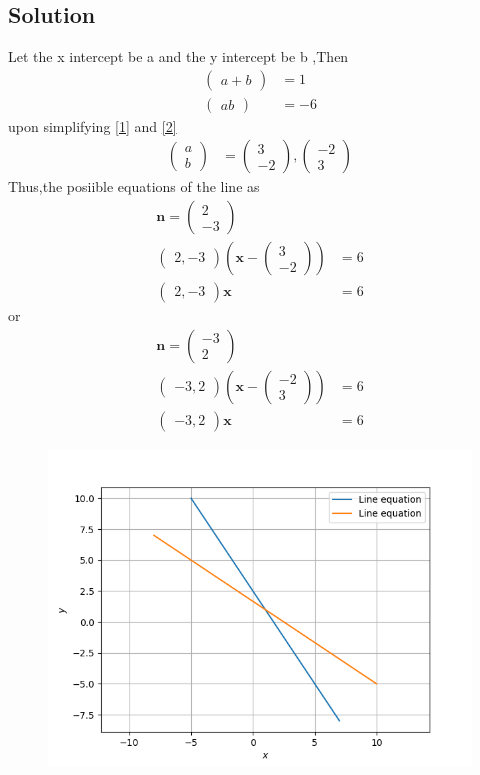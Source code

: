 \documentclass[12pt]{article}
\newcommand{\myvec}[1]{\ensuremath{\begin{pmatrix}#1\end{pmatrix}}}
\let\vec\mathbf
\begin{document}
\begin{enumerate}
\section{Solution}
Let the x intercept be a and  the y intercept be b ,Then
\begin{align}
\myvec{a+b}&=1\label{1}\\
\myvec{ab}&=-6 \label{2}
\end{align}
upon simplifying \eqref{1} and \eqref{2}
\begin{align}
\myvec{a\\b}&=\myvec{3\\-2},\myvec{-2\\3}
\end{align}
Thus,the posiible equations of the line as
\begin{align}
\vec{n}=\myvec{2\\-3}\\
\myvec{2,-3}(\vec{x}-\myvec{3\\-2})&=6\\
\myvec{2,-3}\vec{x}&=6
\end{align}
     \hspace{60mm} or
\begin{align}
\vec{n}=\myvec{-3\\2}\\
\myvec{-3,2}(\vec{x}-\myvec{-2\\3})&=6\\
\myvec{-3,2}\vec{x}&=6
\end{align}
\begin{figure}[h!]
\centering
\includegraphics[width=\columnwidth]{./figs/inter.png}
\caption{}
\label{fig:inter.png}
\end{figure}
\end{enumerate}
\end{document}

